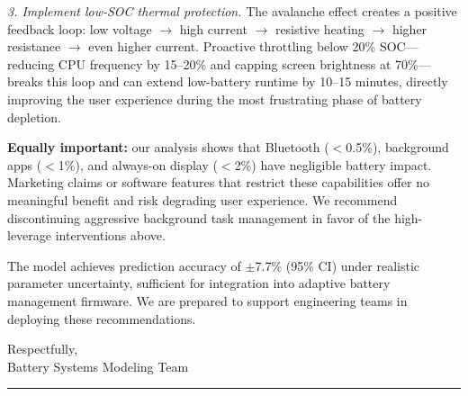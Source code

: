 \documentclass{mcmthesis}
\begin{document}
\textit{3. Implement low-SOC thermal protection.} The avalanche effect creates a positive feedback loop: low voltage $\to$ high current $\to$ resistive heating $\to$ higher resistance $\to$ even higher current. Proactive throttling below 20\% SOC---reducing CPU frequency by 15--20\% and capping screen brightness at 70\%---breaks this loop and can extend low-battery runtime by 10--15 minutes, directly improving the user experience during the most frustrating phase of battery depletion.

\textbf{Equally important:} our analysis shows that Bluetooth ($<$0.5\%), background apps ($<$1\%), and always-on display ($<$2\%) have negligible battery impact. Marketing claims or software features that restrict these capabilities offer no meaningful benefit and risk degrading user experience. We recommend discontinuing aggressive background task management in favor of the high-leverage interventions above.

The model achieves prediction accuracy of $\pm$7.7\% (95\% CI) under realistic parameter uncertainty, sufficient for integration into adaptive battery management firmware. We are prepared to support engineering teams in deploying these recommendations.

\medskip
\noindent
Respectfully,\\
Battery Systems Modeling Team

\medskip
\noindent\rule{\linewidth}{0.4pt}
\newpage
\printbibliography
\end{document}
